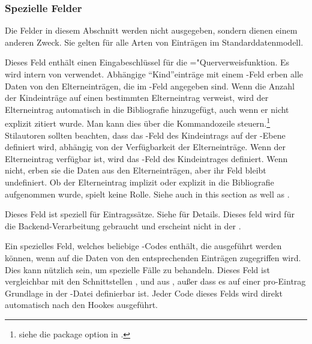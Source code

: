 \documentclass{ltxdockit}[2011/03/25]
\begin{document}
\subsubsection{Spezielle Felder} \label{bib:fld:spc}

Die Felder in diesem Abschnitt werden nicht ausgegeben, sondern dienen einem
anderen Zweck. Sie gelten für alle Arten von Einträgen im Standarddatenmodell.

\begin{fieldlist}


Dieses Feld enthält einen Eingabeschlüssel für die \bibtex="Querverweisfunktion.
Es wird intern von \bibtex verwendet. Abhängige
"`Kind"'einträge mit einem -Feld erben alle Daten von den
Elterneinträgen, die im -Feld angegeben sind. Wenn die Anzahl
der Kindeinträge auf einen bestimmten Elterneintrag verweist, wird der
Elterneintrag automatisch in die Bibliografie hinzugefügt, auch wenn er nicht
explizit zitiert wurde. Man kann dies über die  Kommandozeile
steuern.\footnote{siehe die  package option in
.} Stilautoren sollten beachten, dass das
-Feld des Kindeintrags auf der -Ebene definiert
wird, abhängig von der Verfügbarkeit der Elterneinträge. Wenn der Elterneintrag
verfügbar ist, wird das -Feld des Kindeintrages definiert.
Wenn nicht, erben sie die Daten aus den Elterneinträgen, aber ihr
 Feld bleibt undefiniert. Ob der Elterneintrag implizit oder
explizit in die Bibliografie aufgenommen wurde, spielt keine Rolle. Siehe auch
 in this section as well as .


Dieses Feld ist speziell für Eintragssätze.
Siehe  für Details. Dieses feld wird für die Backend-Verarbeitung 
gebraucht und erscheint nicht in der . 


Ein spezielles Feld, welches beliebige \tex-Codes enthält, die ausgeführt werden
können, wenn auf die Daten von den entsprechenden Einträgen zugegriffen wird.
Dies kann nützlich sein, um spezielle Fälle zu behandeln. Dieses Feld ist
vergleichbar mit den Schnittstellen , 
und  aus , außer dass es auf einer
pro-Eintrag Grundlage in der -Datei definierbar ist. Jeder Code dieses
Felds wird direkt automatisch nach den Hookes ausgeführt.


\end{fieldlist}
\end{document}
